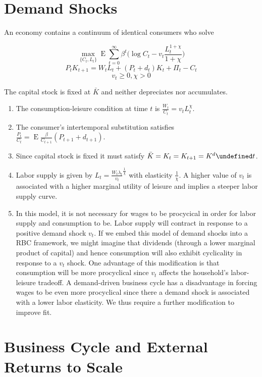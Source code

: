 \documentclass[11pt]{article}
\let\oldforall\forall
\let\forall\undefined
\DeclareMathOperator{\forall}{\oldforall}
\DeclareMathOperator{\ev}{E}
\begin{document}
\section{Demand Shocks}

    An economy contains a continuum of identical consumers who solve

        $$ \max_{\{C_t, L_t\}} \ev \sum_{t=0}^\infty \beta^t \bigg ( \log C_t - v_t \frac{L_t^{1+\chi}}{1+\chi} \bigg ) $$
        $$ P_t K_{t+1} = W_t L_t + (P_t + d_t) K_t + \Pi_t - C_t $$
        $$ v_t \geq 0, \chi > 0 $$

    The capital stock is fixed at $\bar K$ and neither depreciates nor accumulates.

    \begin{enumerate}

        \item The consumption-leisure condition at time $t$ is $\frac{W_t}{C_t} = v_t L_t^\chi$.
        \item The consumer's intertemporal substitution satisfies $\frac{P_t}{C_t} = \ev \frac{\beta}{C_{t+1}} (P_{t+1} + d_{t+1})$.
        \item Since capital stock is fixed it must satisfy $\bar K = K_t = K_{t+1} = K^d \forall t$.
        \item Labor supply is given by $L_t = \frac{W_t \lambda_t}{v_t}^\frac{1}{\chi}$ with elasticity $\frac{1}{\chi}$. A higher value of $v_t$ is associated with a higher marginal utility of leisure and implies a steeper labor supply curve.
        \item In this model, it is not necessary for wages to be procycical in order for labor supply and consumption to be. Labor supply will contract in response to a positive demand shock $v_t$. If we embed this model of demand shocks into a RBC framework, we might imagine that dividends (through a lower marginal product of capital) and hence consumption will also exhibit cyclicality in response to a $v_t$ shock. One advantage of this modification is that consumption will be more procyclical since $v_t$ affects the household's labor-leisure tradeoff. A demand-driven business cycle has a disadvantage in forcing wages to be even more procyclical since there a demand shock is associated with a lower labor elasticity. We thus require a further modification to improve fit.

    \end{enumerate}

\section{Business Cycle and External Returns to Scale}
\end{document}
